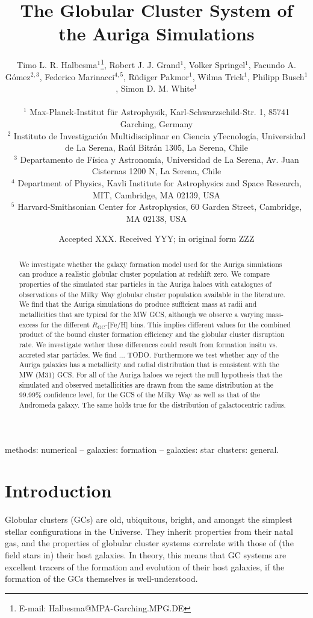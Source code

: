 \documentclass[a4paper,fleqn,usenatbib]{mnras}
\title[Auriga GCS]{The Globular Cluster System of the Auriga Simulations}
\author[T. L. R. Halbesma et al.]{\parbox[t]{\textwidth}{
    Timo L. R. Halbesma$^{1}$\thanks{E-mail: Halbesma@MPA-Garching.MPG.DE},
    Robert J. J. Grand$^{1}$, 
    Volker Springel$^{1}$, 
    Facundo A. G\'{o}mez$^{2,3}$, 
    Federico Marinacci$^{4,5}$,
    R\"{u}diger Pakmor$^{1}$, 
    Wilma Trick$^{1}$,
    Philipp Busch$^{1}$,
    Simon D. M. White$^{1}$
} \vspace{10pt} \\
$^{1}$ Max-Planck-Institut f\"ur Astrophysik, Karl-Schwarzschild-Str. 1,
    85741 Garching, Germany \\
$^{2}$ Instituto de Investigaci\'{o}n Multidisciplinar en Ciencia yTecnolog\'{i}a, 
    Universidad de La Serena, Ra\'{u}l Bitr\'{a}n 1305, La Serena, Chile \\
$^{3}$ Departamento de F\'{i}sica y Astronom\'{i}a, Universidad de La Serena, Av.
    Juan Cisternas 1200 N, La Serena, Chile \\
$^{4}$ Department of Physics, Kavli Institute for Astrophysics and Space Research,
    MIT, Cambridge, MA 02139, USA \\
$^{5}$ Harvard-Smithsonian Center for Astrophysics, 60 Garden Street, Cambridge,
    MA 02138, USA \\
}
\date{Accepted XXX. Received YYY; in original form ZZZ}
\begin{document}
\label{firstpage}
\pagerange{\pageref{firstpage}--\pageref{lastpage}}
\maketitle

\begin{abstract}
We investigate whether the galaxy formation model used for the Auriga simulations 
can produce a realistic globular cluster population at redshift zero. We compare
properties of the simulated star particles in the Auriga haloes with
catalogues of observations of the Milky Way globular cluster population available
in the literature. We find that the Auriga simulations do produce sufficient mass
at radii and metallicities that are typical for the MW GCS, although we observe
a varying mass-excess for the different $R_{\text{GC}}$-[Fe/H] bins. This implies
different values for the combined product of the bound cluster formation efficiency
and the globular cluster disruption rate. We investigate wether these differences
could result from formation insitu vs. accreted star particles. We find ... TODO.
Furthermore we test whether any of the Auriga galaxies has a metallicity and radial
distribution that is consistent with the MW (M31) GCS. For all of the Auriga haloes
we reject the null hypothesis that the simulated and observed metallicities are 
drawn from the same distribution at the 99.99\% confidence level, for the GCS
of the Milky Way as well as that of the Andromeda galaxy. The same holds true for
the distribution of galactocentric radius.
\end{abstract}

\begin{keywords}
methods: numerical -- galaxies: formation -- galaxies: star clusters: general.
\end{keywords}



\section{Introduction}
Globular clusters (GCs) are old, ubiquitous, bright, and amongst the simplest
stellar configurations in the Universe. They inherit properties from their natal
gas, and the properties of globular cluster systems correlate with those of
(the field stars in) their host galaxies. In theory, this means that GC systems 
are excellent tracers of the formation and evolution of their host galaxies, if 
the formation of the GCs themselves is well-understood.
\end{document}
